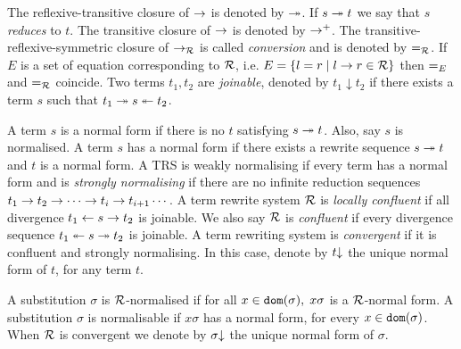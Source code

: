 The reflexive-transitive closure of $\rightarrow$ is denoted by $\twoheadrightarrow$. If $s \twoheadrightarrow t$ we say that $s$ \textit{reduces} to $t$. The transitive closure of $\rightarrow$ is denoted by $\rightarrow^+$. The transitive-reflexive-symmetric closure of $\rightarrow_{\mathcal{R}}$ is called \textit{conversion} and is denoted by $\eqUnif{\trs}$. If $E$ is a set of equation corresponding to $\mathcal{R}$, i.e. $E = \{ l = r \mid l \rightarrow r \in \mathcal{R} \}$ then $\eqUnif{E}$ and $\eqUnif{\trs}$ coincide. Two terms $t_1, t_2$ are \textit{joinable}, denoted by $t_1 \downarrow t_2$ if there exists a term $s$ such that $t_1 \twoheadrightarrow s \twoheadleftarrow t_2$.

A term $s$ is a normal form if there is no $t$ satisfying $s \twoheadrightarrow t$. Also, say $s$ is normalised. A term $s$ has a normal form if there exists a rewrite sequence $s \twoheadrightarrow t$ and $t$ is a normal form. A TRS is weakly normalising if every term has a normal form and is \textit{strongly normalising} if there are no infinite reduction sequences $t_1 \rightarrow t_2 \rightarrow \cdots \rightarrow t_i \rightarrow t_{i+1} \cdots$. A term rewrite system $\mathcal{R}$ is \textit{locally confluent} if all divergence $t_1 \leftarrow s \rightarrow t_2$ is joinable. We also say $\mathcal{R}$ is \textit{confluent} if every divergence sequence $t_1 \twoheadleftarrow s \twoheadrightarrow t_2$ is joinable. A term rewriting system is \textit{convergent} if it is confluent and strongly normalising. In this case, denote by $t\mathord{\downarrow}$ the unique normal form of $t$, for any term $t$.

A substitution $\sigma$ is $\mathcal{R}$-normalised if for all $x \in \mathtt{dom}(\sigma), \; x \sigma$ is a $\mathcal{R}$-normal form. A substitution $\sigma$ is normalisable if $x \sigma$ has a normal form, for every $x \in \mathtt{dom}(\sigma)$. When $\mathcal{R}$ is convergent we denote by $\sigma\mathord{\downarrow}$ the unique normal form of $\sigma$.
